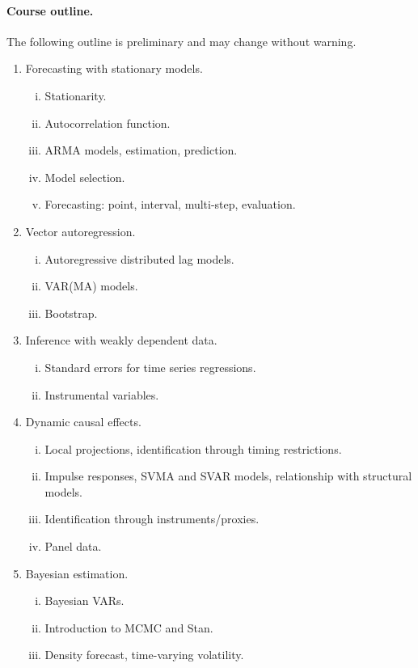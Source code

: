 \documentclass[12pt]{article}
\begin{document}
\paragraph{Course outline.}
The following outline is preliminary and may change without warning.
\begin{enumerate}
\item Forecasting with stationary models.
	\begin{enumerate}[i)]
	\item Stationarity.
	\item Autocorrelation function.
	\item ARMA models, estimation, prediction.
	\item Model selection.
	\item Forecasting: point, interval, multi-step, evaluation.
	\end{enumerate}
\item Vector autoregression.
	\begin{enumerate}[i)]
	\item Autoregressive distributed lag models.
	\item VAR(MA) models.
	\item Bootstrap.
	\end{enumerate}
\item Inference with weakly dependent data.
	\begin{enumerate}[i)]
	\item Standard errors for time series regressions.
	\item Instrumental variables.
	\end{enumerate}
\item Dynamic causal effects.
	\begin{enumerate}[i)]
	\item Local projections, identification through timing restrictions.
	\item Impulse responses, SVMA and SVAR models, relationship with structural models.
	\item Identification through instruments/proxies.
	\item Panel data.
	\end{enumerate}
\item Bayesian estimation.
	\begin{enumerate}[i)]
	\item Bayesian VARs.
	\item Introduction to MCMC and Stan.
	\item Density forecast, time-varying volatility.
	\end{enumerate}

\end{enumerate}
\end{document}
